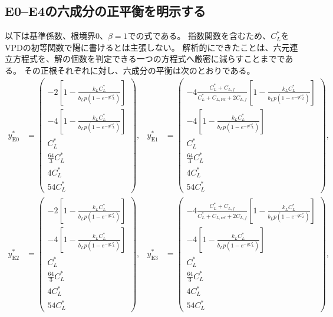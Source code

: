\documentclass[a4paper,11pt]{ltjsarticle}
\begin{document}
\subsection{E0--E4の六成分の正平衡を明示する}\label{sec:explicitroots}
以下は基準係数、根境界0、$\beta=1$での式である。
指数関数を含むため、$C_L^*$をVPDの初等関数で陽に書けるとは主張しない。
解析的にできたことは、六元連立方程式を、解の個数を判定できる一つの方程式へ厳密に減らすことまでである。
その正根それぞれに対し、六成分の平衡は次のとおりである。
\begin{align}
y^*_{\mathrm{E0}}&=
\begin{pmatrix}
-2[1-\frac{k_LC_L^*}{b_Lp(1-e^{-qC_L^*})}]\\
-4[1-\frac{k_LC_L^*}{b_Lp(1-e^{-qC_L^*})}]\\
C_L^*\\ \frac{64}{3}C_L^*\\4C_L^*\\54C_L^*
\end{pmatrix},
&
y^*_{\mathrm{E1}}&=
\begin{pmatrix}
-4\frac{C_L^*+C_{L,f}}{C_L^*+C_{L,\mathrm{ref}}+2C_{L,f}}
 [1-\frac{k_LC_L^*}{b_Lp(1-e^{-qC_L^*})}]\\
-4[1-\frac{k_LC_L^*}{b_Lp(1-e^{-qC_L^*})}]\\
C_L^*\\ \frac{64}{3}C_L^*\\4C_L^*\\54C_L^*
\end{pmatrix},\label{eq:explicit01}\\
y^*_{\mathrm{E2}}&=
\begin{pmatrix}
-2[1-\frac{k_LC_L^*}{b_Lp(1-e^{-qC_L^*})}]\\
-4[1-\frac{k_LC_L^*}{b_Lp(1-e^{-qC_L^*})}]\\
C_L^*\\ \frac{64}{3}C_L^*\\4C_L^*\\54C_L^*
\end{pmatrix},
&
y^*_{\mathrm{E3}}&=
\begin{pmatrix}
-4\frac{C_L^*+C_{L,f}}{C_L^*+C_{L,\mathrm{ref}}+2C_{L,f}}
 [1-\frac{k_LC_L^*}{b_Lp(1-e^{-qC_L^*})}]\\
-4[1-\frac{k_LC_L^*}{b_Lp(1-e^{-qC_L^*})}]\\
C_L^*\\ \frac{64}{3}C_L^*\\4C_L^*\\54C_L^*
\end{pmatrix},\label{eq:explicit23}
\end{align}
\end{document}
